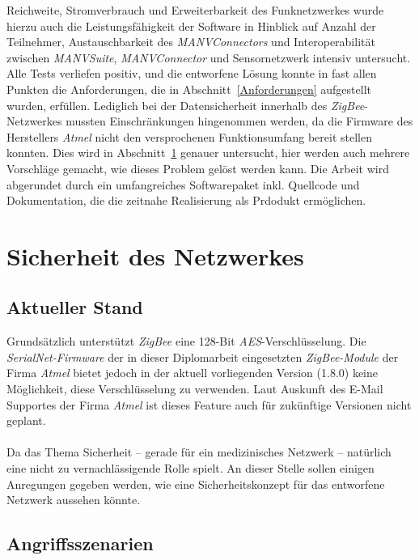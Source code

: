 Reichweite, Stromverbrauch und Erweiterbarkeit des Funknetzwerkes wurde hierzu auch die Leistungsfähigkeit der 
Software in Hinblick auf Anzahl der Teilnehmer, Austauschbarkeit des \emph{MANVConnectors} und Interoperabilität
zwischen \emph{MANVSuite}, \emph{MANVConnector} und Sensornetzwerk intensiv untersucht. Alle Tests verliefen
positiv, und die entworfene Lösung konnte in fast allen Punkten die Anforderungen, die in Abschnitt~\ref{Anforderungen}
aufgestellt wurden, erfüllen. Lediglich bei der Datensicherheit innerhalb des \emph{ZigBee}-Netzwerkes mussten
Einschränkungen hingenommen werden, da die Firmware des Herstellers \emph{Atmel} nicht den versprochenen
Funktionsumfang bereit stellen konnten. Dies wird in Abschnitt~\ref{Sicherheit} genauer untersucht, hier werden
auch mehrere Vorschläge gemacht, wie dieses Problem gelöst werden kann. Die Arbeit wird abgerundet durch ein
umfangreiches Softwarepaket inkl. Quellcode und Dokumentation, die die zeitnahe Realisierung als Prdodukt ermöglichen.

\section{Sicherheit des Netzwerkes}
\label{Sicherheit}
\subsection{Aktueller Stand}
Grundsätzlich unterstützt \emph{ZigBee} eine 128-Bit \emph{AES}-Verschlüsselung. Die \emph{SerialNet-Firmware} der in 
dieser Diplomarbeit eingesetzten \emph{ZigBee-Module} der Firma \emph{Atmel} bietet jedoch in der aktuell vorliegenden 
Version (1.8.0) keine Möglichkeit, diese Verschlüsselung zu verwenden. Laut Auskunft des E-Mail Supportes der Firma 
\emph{Atmel} ist dieses Feature auch für zukünftige Versionen nicht geplant.\\
\\
Da das Thema Sicherheit -- gerade für ein medizinisches Netzwerk -- natürlich eine nicht zu vernachlässigende Rolle spielt.
An dieser Stelle sollen einigen Anregungen gegeben werden, wie eine Sicherheitskonzept für das entworfene Netzwerk aussehen 
könnte.

\subsection{Angriffsszenarien}

